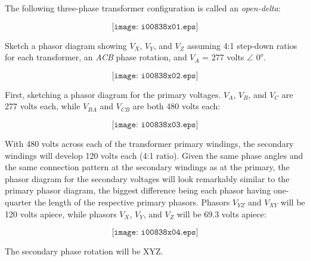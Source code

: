 

The following three-phase transformer configuration is called an {\it open-delta}:

$$\texttt{[image: i00838x01.eps]}$$

Sketch a phasor diagram showing $V_X$, $V_Y$, and $V_Z$ assuming 4:1 step-down ratios for each transformer, an {\it ACB} phase rotation, and $V_A$ = 277 volts $\angle$ $0^o$.

$$\texttt{[image: i00838x02.eps]}$$







First, sketching a phasor diagram for the primary voltages.  $V_A$, $V_B$, and $V_C$ are 277 volts each, while $V_{BA}$ and $V_{CB}$ are both 480 volts each:

$$\texttt{[image: i00838x03.eps]}$$

With 480 volts across each of the transformer primary windings, the secondary windings will develop 120 volts each (4:1 ratio).  Given the same phase angles and the same connection pattern at the secondary windings as at the primary, the phasor diagram for the secondary voltages will look remarkably similar to the primary phasor diagram, the biggest difference being each phasor having one-quarter the length of the respective primary phasors.  Phasors $V_{YZ}$ and $V_{XY}$ will be 120 volts apiece, while phasors $V_X$, $V_Y$, and $V_Z$ will be 69.3 volts apiece:

$$\texttt{[image: i00838x04.eps]}$$

The secondary phase rotation will be XYZ.










